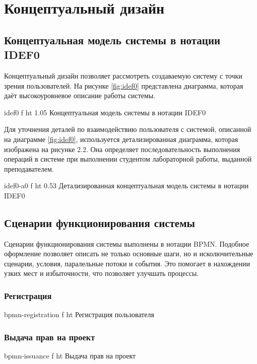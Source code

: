 \documentclass{bmstu}
\begin{document}
  \chapter{Концептуальный дизайн}
  
  \section{Концептуальная модель системы в нотации IDEF0}
  
  Концептуальный дизайн позволяет рассмотреть создаваемую систему с
  точки зрения пользователей. На рисунке \ref{fig:idef0} представлена диаграмма,
  которая даёт высокоуровневое описание работы системы.
  
  {idef0}
  {f}
  {ht}
  {1.05\textwidth}
  {Концептуальная модель системы в нотации IDEF0}
  \label{fig:idef0}
  
  Для уточнения деталей по взаимодействию пользователя с системой, описанной 
  на диаграмме \ref{fig:idef0}, используется детализированная диаграмма, которая изображена
  на рисунке 2.2. Она определяет последовательность выполнения операций в системе
  при выполнении студентом лабораторной работы, выданной преподавателем.
  
  {idef0-a0}
  {f}
  {ht}
  {0.53\textwidth}
  {Детализированная концептуальная модель системы в нотации IDEF0}
  \label{fig:idef0-a0}
  
  \FloatBarrier
  
\section{Сценарии функционирования системы}

Сценарии функционирования системы выполнены в нотации BPMN. 
Подобное оформление позволяет описать не только основные шаги, но и
исколючительные сценарии, условия, паралельные потоки и события. 
Это помогает в нахождении узких мест и избыточности, что
позволяет улучшать процессы. 

\subsection*{Регистрация}
{bpmn-registration}
{f}
{ht}
{\textwidth}
{Регистрация пользователя}
\FloatBarrier

\subsection*{Выдача прав на проект}
{bpmn-issuance}
{f}
{ht}
{\textwidth}
{Выдача прав на проект}
\FloatBarrier
\end{document}
